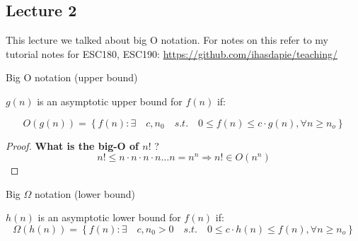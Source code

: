 \documentclass[../notes.tex]{subfiles}
\begin{document}
\subsection{Lecture 2}


This lecture we talked about big O notation. For notes on this refer to my tutorial notes for ESC180, ESC190: \href{https://github.com/ihasdapie/teaching/}{https://github.com/ihasdapie/teaching/}


\begin{definition}
	Big O notation (upper bound)

	$ g(n) $  is an asymptotic upper bound for $ f(n) $ if:

	\begin{equation}
		O(g(n)) = \left\{f(n): \exists \quad c, n_0 \quad s.t. \quad 0 \le  f(n) \le  c\cdot g(n), \forall n \ge  n_o \right\}
		\label{eq:358:bigOh}
	\end{equation}
\end{definition}

\begin{proof}

	\textbf{What is the big-O of $ n! $ }?
	\begin{equation}
			n! \le n \cdot n \cdot n \cdot  n \ldots n = n^n \Rightarrow n! \in O(n^n) 
	\end{equation}
\end{proof}



\begin{definition}
	Big $ \Omega $  notation (lower bound)

	$ h(n) $  is an asymptotic lower bound for $ f(n) $ if:
	\begin{equation}
		\Omega(h(n)) =  \left\{f(n): \exists \quad {c, n_0} > 0 \quad s.t. \quad 0 \le c \cdot h(n) \le  f(n), \forall n \ge  n_o \right\}
		\label{eq:358:bigOmega}
	\end{equation}
\end{definition}
\end{document}
